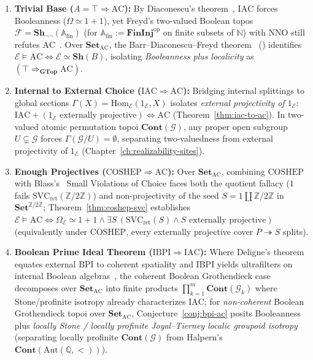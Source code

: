 \documentclass[10pt,twoside,openright]{book}
\theoremstyle{crmplain}
\theoremstyle{crmdef}
\theoremstyle{crmremark}
\begin{document}
\begin{enumerate}[label=\textbf{\arabic*.},leftmargin=1.8em]
  \item \textbf{Trivial Base ($A = \top \Rightarrow \mathrm{AC}$):} By Diaconescu's theorem~\cite{Diaconescu75}, $\mathrm{IAC}$ forces Booleanness ($\Omega \simeq 1+1$), yet Freyd's two-valued Boolean topos $\mathcal{F} = \mathbf{Sh}_{\neg\neg}(\mathbb{A}_{\mathrm{fin}})$ (for $\mathbb{A}_{\mathrm{fin}} := \mathbf{FinInj}^{\mathrm{op}}$ on finite subsets of $\mathbb{N}$) with $\mathrm{NNO}$ still refutes $\mathrm{AC}$~\cite{Freyd72}. Over $\mathbf{Set}_{\mathrm{AC}}$, the Barr--Diaconescu--Freyd theorem~\cite{Barr74,Diaconescu75,Freyd72} (\cite[\S D4.5]{Johnstone02}) identifies $\mathcal{E} \models \mathrm{AC} \iff \mathcal{E} \simeq \mathbf{Sh}(B)$, isolating \emph{Booleanness plus localicity} as $(\top \Rightarrow_{\mathbf{GTop}} \mathrm{AC})$.
  \item \textbf{Internal to External Choice ($\mathrm{IAC} \Rightarrow \mathrm{AC}$):} Bridging internal splittings to global sections $\Gamma(X) = \mathrm{Hom}_{\mathcal{E}}(1_{\mathcal{E}}, X)$ isolates \emph{external projectivity of $1_{\mathcal{E}}$}: $\mathrm{IAC} + (1_{\mathcal{E}} \text{ externally projective}) \iff \mathrm{AC}$ (Theorem~\ref{thm:iac-to-ac}). In two-valued atomic permutation topoi $\mathbf{Cont}(\mathcal{G})$, any proper open subgroup $U \subsetneq \mathcal{G}$ forces $\Gamma(\mathcal{G}/U) = \emptyset$, separating two-valuedness from external projectivity of $1_{\mathcal{E}}$ (Chapter~\ref{ch:realizability-sites}).
  \item \textbf{Enough Projectives ($\mathrm{COSHEP} \Rightarrow \mathrm{AC}$):} Over $\mathbf{Set}_{\mathrm{AC}}$, combining $\mathrm{COSHEP}$ with Blass's~\cite{Blass79} Small Violations of Choice faces both the quotient fallacy ($1$ fails $\mathrm{SVC}_{\mathrm{ret}}(\mathbb{Z}/2\mathbb{Z})$) and non-projectivity of the seed $S = 1 \amalg \mathbb{Z}/2\mathbb{Z}$ in $\mathbf{Set}^{\mathbb{Z}/2\mathbb{Z}}$; Theorem~\ref{thm:coshep-svc} establishes $\mathcal{E} \models \mathrm{AC} \iff \Omega_{\mathcal{E}} \simeq 1+1 \wedge \exists S\,(\mathrm{SVC}_{\mathrm{ret}}(S) \wedge S \text{ externally projective})$ (equivalently under $\mathrm{COSHEP}$, every externally projective cover $P \twoheadrightarrow S$ splits).
  \item \textbf{Boolean Prime Ideal Theorem ($\mathrm{IBPI} \Rightarrow \mathrm{IAC}$):} Where Deligne's theorem~\cite[Exp.~VI, Appendice]{Deligne72} equates external $\mathrm{BPI}$ to coherent spatiality and $\mathrm{IBPI}$ yields ultrafilters on internal Boolean algebras~\cite{Johnstone82,Johnstone02}, the coherent Boolean Grothendieck case decomposes over $\mathbf{Set}_{\mathrm{AC}}$ into finite products $\prod_{k=1}^m \mathbf{Cont}(\mathcal{G}_k)$ where Stone/profinite isotropy already characterizes $\mathrm{IAC}$; for \emph{non-coherent} Boolean Grothendieck topoi over $\mathbf{Set}_{\mathrm{AC}}$, Conjecture~\ref{conj:bpi-ac} posits Booleanness plus \emph{locally Stone / locally profinite Joyal--Tierney localic groupoid isotropy} (separating locally profinite $\mathbf{Cont}(\mathcal{G})$ from Halpern's $\mathbf{Cont}(\mathrm{Aut}(\mathbb{Q}, <))$).

\end{enumerate}
\end{document}
